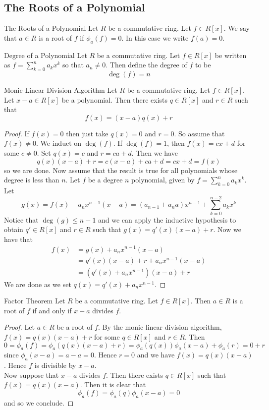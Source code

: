\documentclass[a4paper]{article}
\begin{document}
\subsection{The Roots of a Polynomial}
\begin{defn}{The Roots of a Polynomial}{} Let $R$ be a commutative ring. Let $f\in R[x]$. We say that $a\in R$ is a root of $f$ if $\phi_a(f)=0$. In this case we write $f(a)=0$. 
\end{defn}

\begin{defn}{Degree of a Polynomial}{} Let $R$ be a commutative ring. Let $f\in R[x]$ be written as $f=\sum_{k=0}^n a_kx^k$ so that $a_n\neq 0$. Then define the degree of $f$ to be $$\deg(f)=n$$
\end{defn}

\begin{thm}{Monic Linear Division Algorithm}{} Let $R$ be a commutative ring. Let $f\in R[x]$. Let $x-a\in R[x]$ be a polynomial. Then there exists $q\in R[x]$ and $r\in R$ such that $$f(x)=(x-a)q(x)+r$$ 
\begin{proof}
If $f(x)=0$ then just take $q(x)=0$ and $r=0$. So assume that $f(x)\neq 0$. We induct on $\deg(f)$. If $\deg(f)=1$, then $f(x)=cx+d$ for some $c\neq 0$. Set $q(x)=c$ and $r=ca+d$. Then we have $$q(x)(x-a)+r=c(x-a)+ca+d=cx+d=f(x)$$ so we are done. Now assume that the result is true for all polynomials whose degree is less than $n$. Let $f$ be a degree $n$ polynomial, given by $f=\sum_{k=0}^na_kx^k$. Let $$g(x)=f(x)-a_nx^{n-1}(x-a)=(a_{n-1}+a_na)x^{n-1}+\sum_{k=0}^{n-2}a_kx^k$$ Notice that $\deg(g)\leq n-1$ and we can apply the inductive hypothesis to obtain $q'\in R[x]$ and $r\in R$ such that $g(x)=q'(x)(x-a)+r$. Now we have that 
\begin{align*}
f(x)&=g(x)+a_nx^{n-1}(x-a)\\
&=q'(x)(x-a)+r+a_nx^{n-1}(x-a)\\
&=\left(q'(x)+a_nx^{n-1}\right)(x-a)+r
\end{align*}
We are done as we set $q(x)=q'(x)+a_nx^{n-1}$. 
\end{proof}
\end{thm}

\begin{thm}{Factor Theorem}{} Let $R$ be a commutative ring. Let $f\in R[x]$. Then $a\in R$ is a root of $f$ if and only if $x-a$ divides $f$. 
\begin{proof}
Let $a\in R$ be a root of $f$. By the monic linear division algorithm, $f(x)=q(x)(x-a)+r$ for some $q\in R[x]$ and $r\in R$. Then $$0=\phi_a(f)=\phi_a(q(x)(x-a)+r)=\phi_a(q(x))\phi_a(x-a)+\phi_a(r)=0+r$$ since $\phi_a(x-a)=a-a=0$. Hence $r=0$ and we have $f(x)=q(x)(x-a)$. Hence $f$ is divisible by $x-a$. \\

Now suppose that $x-a$ divides $f$. Then there exists $q\in R[x]$ such that $f(x)=q(x)(x-a)$. Then it is clear that $$\phi_a(f)=\phi_a(q)\phi_a(x-a)=0$$ and so we conclude. 
\end{proof}
\end{thm}
\end{document}
